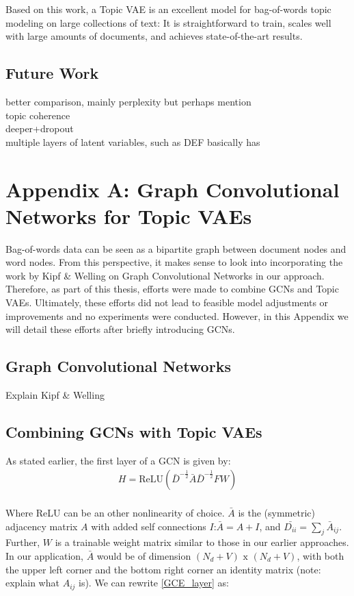 \documentclass{report}
\begin{document}
Based on this work, a Topic VAE is an excellent model for bag-of-words topic modeling on large collections of text: It is straightforward to train, scales well with large amounts of documents, and achieves state-of-the-art results. 

\section{Future Work}
better comparison, mainly perplexity but perhaps mention\\ topic coherence\\
deeper+dropout\\
multiple layers of latent variables, such as DEF basically has



	\chapter{Appendix A: Graph Convolutional Networks for Topic VAEs}
	Bag-of-words data can be seen as a bipartite graph between document nodes and word nodes. From this perspective, it makes sense to look into incorporating the work by Kipf \& Welling \cite{kipf2016semi} on Graph Convolutional Networks in our approach. Therefore, as part of this thesis, efforts were made to combine GCNs and Topic VAEs. Ultimately, these efforts did not lead to feasible  model adjustments or improvements and no experiments were conducted. However, in this Appendix we will detail these efforts after briefly introducing GCNs. 

	\section{Graph Convolutional Networks}
	Explain Kipf \& Welling 
	\section{Combining GCNs with Topic VAEs}	
	As stated earlier, the first layer of a GCN is given by:
	\begin{align}\label{GCE_layer}
	H = \text{ReLU}(\bar{D}^{-\frac{1}{2}}\bar{A}\bar{D}^{-\frac{1}{2}}FW)
	\end{align}
	\\
	Where ReLU can be an other nonlinearity of choice. $\bar{A}$ is the (symmetric) adjacency matrix $A$ with added self connections $I$:$\bar{A} = A+I$, and $\bar{D_{ii}}=\sum_j\bar{A}_{ij}$. Further, $W$ is a trainable weight matrix similar to those in our earlier approaches. In our application, $\bar{A}$ would be of dimension $(N_d + V) \text{ x } (N_d + V)$, with both the upper left corner and the bottom right corner an identity matrix (note: explain what $A_{ij}$ is). We can rewrite \ref{GCE_layer} as:
	
\end{document}
